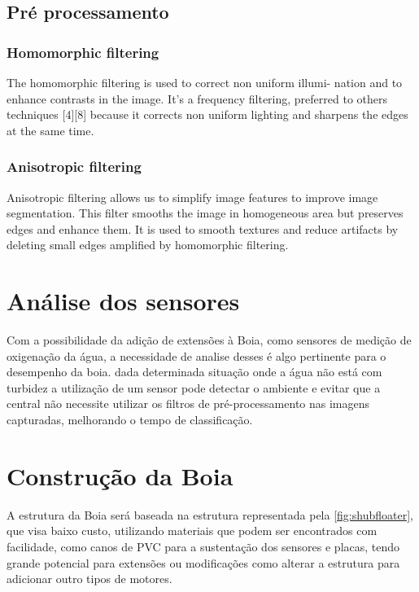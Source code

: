 \subsection{Pré processamento}


\subsubsection{Homomorphic filtering}

The homomorphic filtering is used to correct non uniform illumi- nation and to enhance contrasts in the image. It’s a frequency filtering, preferred to others techniques [4][8] because it corrects non uniform lighting and sharpens the edges at the same time.


\subsubsection{Anisotropic filtering}
 Anisotropic filtering allows us to simplify image features to improve image segmentation. This filter smooths the image in homogeneous area but preserves edges and enhance them. It is used to smooth textures and reduce artifacts by deleting small edges amplified by homomorphic filtering.


\section{Análise dos sensores}
Com a possibilidade da adição de extensões à Boia, como sensores de medição de oxigenação da água, a necessidade de analise desses é algo pertinente para o desempenho da boia. dada determinada situação onde a água não está com turbidez a utilização de um sensor pode detectar o ambiente e evitar que a central não necessite utilizar os filtros de pré-processamento nas imagens capturadas, melhorando o tempo de classificação.




\section{Construção da Boia}

A estrutura da Boia será baseada na estrutura representada pela  \autoref{fig:shubfloater}, que visa baixo custo, utilizando materiais que podem ser encontrados com facilidade, como canos de PVC para a sustentação dos sensores e placas, tendo grande potencial para extensões ou modificações como alterar a estrutura para adicionar outro tipos de motores.


